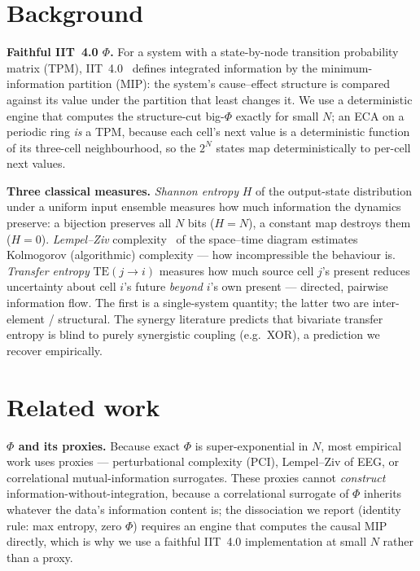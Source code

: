 \documentclass[11pt,a4paper]{article}
\newcommand{\bigphi}{\ensuremath{\Phi}}
\begin{document}
\section{Background}
\label{sec:bg}

\textbf{Faithful IIT~4.0 \bigphi{}.} For a system with a state-by-node
transition probability matrix (TPM), IIT~4.0~\citep{albantakis2023}
defines integrated information by the minimum-information partition (MIP):
the system's cause--effect structure is compared against its value under
the partition that least changes it. We use a deterministic engine that
computes the structure-cut big-\bigphi{} exactly for small \(N\); an ECA
on a periodic ring \emph{is} a TPM, because each cell's next value is a
deterministic function of its three-cell neighbourhood, so the
\(2^N\) states map deterministically to per-cell next values.

\textbf{Three classical measures.}
\emph{Shannon entropy} \(H\) of the output-state distribution under a
uniform input ensemble measures how much information the dynamics
preserve: a bijection preserves all \(N\) bits (\(H=N\)), a constant map
destroys them (\(H=0\)). \emph{Lempel--Ziv} complexity~\citep{lempelziv1976}
of the space--time diagram estimates Kolmogorov (algorithmic) complexity ---
how incompressible the behaviour is. \emph{Transfer entropy}
\citep{schreiber2000} \(\mathrm{TE}(j\!\to\!i)\) measures how much source
cell \(j\)'s present reduces uncertainty about cell \(i\)'s future
\emph{beyond} \(i\)'s own present --- directed, pairwise information flow.
The first is a single-system quantity; the latter two are
inter-element / structural. The synergy literature
\citep{williamsbeer2010} predicts that bivariate transfer entropy is
blind to purely synergistic coupling (e.g.\ XOR), a prediction we
recover empirically.

\section{Related work}
\label{sec:related}

\textbf{\bigphi{} and its proxies.} Because exact \bigphi{} is
super-exponential in \(N\), most empirical work uses proxies ---
perturbational complexity (PCI), Lempel--Ziv of EEG, or correlational
mutual-information surrogates. These proxies cannot \emph{construct}
information-without-integration, because a correlational surrogate of
\bigphi{} inherits whatever the data's information content is; the
dissociation we report (identity rule: max entropy, zero \bigphi{})
requires an engine that computes the causal MIP directly, which is why we
use a faithful IIT~4.0 implementation at small \(N\) rather than a proxy.
\end{document}
